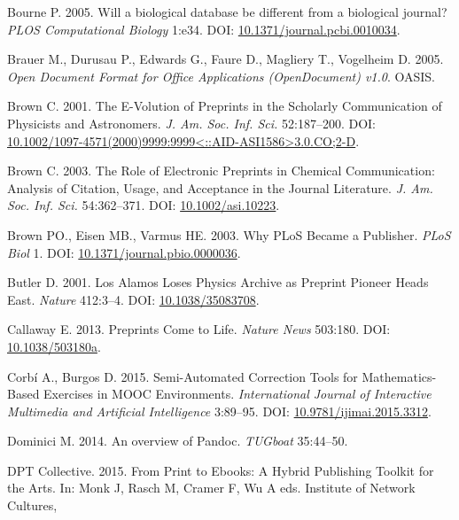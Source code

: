 \documentclass[10pt,fleqn]{wlpeerj}
\begin{document}
\hypertarget{ref-bourneux5fdatabaseux5f2005}{}
Bourne P. 2005. Will a biological database be different from a
biological journal? \emph{PLOS Computational Biology} 1:e34. DOI:
\href{https://doi.org/10.1371/journal.pcbi.0010034}{10.1371/journal.pcbi.0010034}.

\hypertarget{ref-ODF}{}
Brauer M., Durusau P., Edwards G., Faure D., Magliery T., Vogelheim D.
2005. \emph{Open Document Format for Office Applications (OpenDocument)
v1.0}. OASIS.

\hypertarget{ref-brownux5fe-volutionux5f2001}{}
Brown C. 2001. The E-Volution of Preprints in the Scholarly
Communication of Physicists and Astronomers. \emph{J. Am. Soc. Inf.
Sci.} 52:187--200. DOI:
\href{https://doi.org/10.1002/1097-4571(2000)9999:9999\%3C::AID-ASI1586\%3E3.0.CO;2-D}{10.1002/1097-4571(2000)9999:9999\textless{}::AID-ASI1586\textgreater{}3.0.CO;2-D}.

\hypertarget{ref-brownux5froleux5f2003}{}
Brown C. 2003. The Role of Electronic Preprints in Chemical
Communication: Analysis of Citation, Usage, and Acceptance in the
Journal Literature. \emph{J. Am. Soc. Inf. Sci.} 54:362--371. DOI:
\href{https://doi.org/10.1002/asi.10223}{10.1002/asi.10223}.

\hypertarget{ref-brownux5fwhyux5f2003}{}
Brown PO., Eisen MB., Varmus HE. 2003. Why PLoS Became a Publisher.
\emph{PLoS Biol} 1. DOI:
\href{https://doi.org/10.1371/journal.pbio.0000036}{10.1371/journal.pbio.0000036}.

\hypertarget{ref-butlerux5falamosux5f2001}{}
Butler D. 2001. Los Alamos Loses Physics Archive as Preprint Pioneer
Heads East. \emph{Nature} 412:3--4. DOI:
\href{https://doi.org/10.1038/35083708}{10.1038/35083708}.

\hypertarget{ref-callawayux5fpreprintsux5f2013}{}
Callaway E. 2013. Preprints Come to Life. \emph{Nature News} 503:180.
DOI: \href{https://doi.org/10.1038/503180a}{10.1038/503180a}.

\hypertarget{ref-garnetux5fsemiautomaticux5f2015}{}
Corbí A., Burgos D. 2015. Semi-Automated Correction Tools for
Mathematics-Based Exercises in MOOC Environments. \emph{International
Journal of Interactive Multimedia and Artificial Intelligence} 3:89--95.
DOI:
\href{https://doi.org/10.9781/ijimai.2015.3312}{10.9781/ijimai.2015.3312}.

\hypertarget{ref-dominiciux5fpandocux5f2014}{}
Dominici M. 2014. An overview of Pandoc. \emph{TUGboat} 35:44--50.

\hypertarget{ref-dptcollectiveux5ftoolkitux5f2015}{}
DPT Collective. 2015. From Print to Ebooks: A Hybrid Publishing Toolkit
for the Arts. In: Monk J, Rasch M, Cramer F, Wu A eds. Institute of
Network Cultures,
\end{document}

